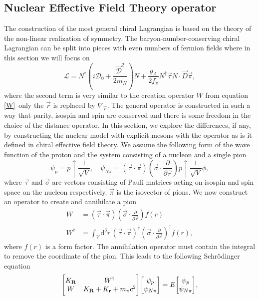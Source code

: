 \subsection{Nuclear Effective Field Theory operator}
The construction of the most general chiral Lagrangian is based on the theory of the non-linear realization of symmetry. The baryon-number-conserving chiral Lagrangian can be split into pieces with even numbers of fermion fields where in this section we will focus on 
\begin{equation}
	\mathcal{L} = N^\dagger \left(i\mathcal{D}_0+\frac{\vec{\mathcal{D}}^2}{2m_N} \right)N+\frac{g_A}{2f_\pi}N^\dagger\vec{\tau}N\cdot \vec{D}\vec{\pi},
\end{equation}
where the second term is very similar to the creation operator $W$ from equation \eqref{W}--only the $\vec{r}$ is replaced by $\nabla_{\vec{r}}$. The general operator is constructed in such a way that parity, isospin and spin are conserved and there is some freedom in the choice of the distance operator. In this section, we explore the differences, if any, by constructing the nuclear model with explicit mesons with the operator as is it defined in chiral effective field theory. We assume the following form of the wave function of the proton and the system consisting of a nucleon and a single pion
\begin{equation}\label{EFT1}
	\psi_p = p\uparrow\frac{1}{\sqrt{V}}, \quad \psi_{N\pi} = (\vec{\tau}\cdot \vec{\pi})(\vec{\sigma}\cdot \frac{\partial}{\partial\vec{r}})p\uparrow \frac{1}{\sqrt{V}}\phi,
\end{equation}
where $\vec{\tau}$ and $\vec{\sigma}$ are vectors consisting of Pauli matrices acting on isospin and spin space on the nucleon respectively. $\vec{\pi}$ is the isovector of pions. We now construct an operator to create and annihilate a pion
\begin{align}\label{EFT2}
	W & = (\vec{\tau}\cdot \vec{\pi})(\vec{\sigma}\cdot \frac{\partial}{\partial\vec{r}})f(r) \\
	W^\dagger & = \int_V \text{d}^3 r \, (\vec{\tau}\cdot \vec{\pi})^\dagger(\vec{\sigma}\cdot \frac{\partial}{\partial\vec{r}})^\dagger f(r), \label{EFT3}
\end{align}
where $f(r)$ is a form factor. The annihilation operator must contain the integral to remove the coordinate of the pion. This leads to the following Schrödinger equation
\begin{equation}
	\mqty[K_{\vec{R}} & W^\dagger \\ W & K_{\vec{R}}+K_{\vec{r}}+m_\pi c^2]\mqty[\psi_p \\ \psi_{N\pi}]=E\mqty[\psi_p \\ \psi_{N\pi}],
\end{equation}
